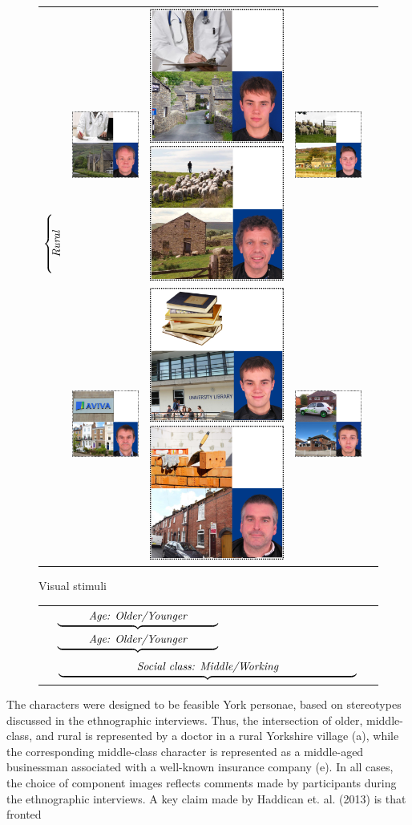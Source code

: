 \documentclass[PWPL]{article}
\begin{document}
\begin{figure}[ht]
\caption{Visual stimuli}
\centering
\begin{tabular}{ccccc}
\multirow{2}{*}{$\rotatebox[origin=t]{90}{$\overbrace{\rule{0.5cm}{0pt}\mathsf{\textit{Rural}}\rule{0.5cm}{0pt}}$\hspace*{-2cm}}$} &\includegraphics[scale=0.25]{M_O_MC_L_1.png} & \includegraphics[scale=0.25]{M_Y_MC_L_1.png} \includegraphics[scale=0.25]{M_O_WC_L_1.png} &\includegraphics[scale=0.25]{M_Y_WC_L_1.png} \\ 
 $\rotatebox[origin=t]{90}{\hspace*{1.5cm}$\overbrace{\rule{0.5cm}{0pt}\mathsf{\textit{Urban}}\rule{0.5cm}{0pt}}$}$
    &\includegraphics[scale=0.25]{M_O_MC_NL_1.png} & \includegraphics[scale=0.25]{M_Y_MC_NL_1.png} \includegraphics[scale=0.25]{M_O_WC_NL_1.png} & \includegraphics[scale=0.25]{M_Y_WC_NL_1.png}\\
\end{tabular}
\end{figure}
\vspace*{-2.25cm}
\begin{figure}[ht]
\centering
\begin{tabular}{lllll}


    &\multicolumn{4}{l}{
    $\underbrace{\rule{1cm}{0pt}{\textit{Age: Older/Younger}}\rule{1cm}{0pt}}$$\underbrace{\rule{1cm}{0pt}{\textit{Age: Older/Younger}}\rule{1cm}{0pt}}$}\\

    &\multicolumn{4}{l}{
$\underbrace{\rule{2.5cm}{0pt}{\textit{Social class: Middle/Working}}\rule{2.5cm}{0pt}}$}\\
   \end{tabular}
\end{figure}

The characters were designed to be feasible York personae, based on stereotypes discussed in the ethnographic interviews. Thus, the intersection of older, middle-class, and rural is represented by a doctor in a rural Yorkshire village (a), while the corresponding middle-class character is represented as a middle-aged businessman associated with a well-known insurance company (e). In all cases, the choice of component images reflects comments made by participants during the ethnographic interviews. A key claim made by Haddican et. al. (2013) is that fronted
\end{document}
